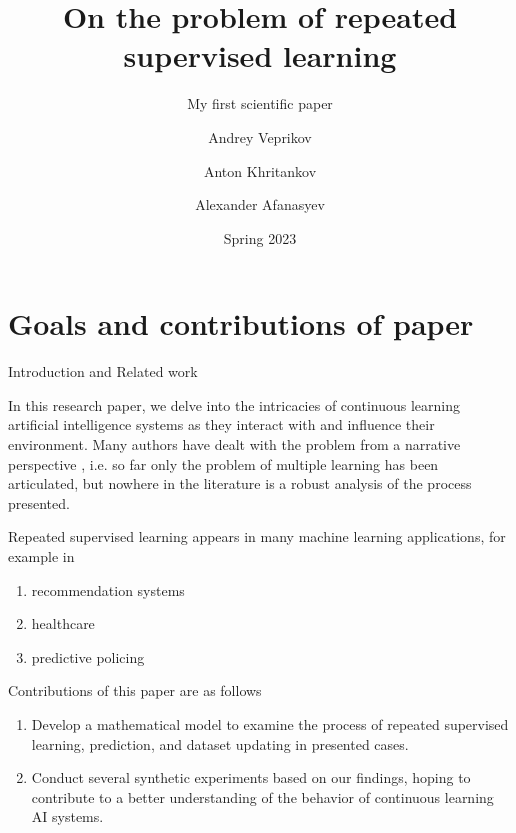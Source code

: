 \documentclass[aspectratio=169]{beamer}
\title[On the problem of repeated supervised learning]{On the problem of repeated supervised learning}
\subtitle{My first scientific paper}
\author[Andrey Veprikov]{Andrey Veprikov \and Anton Khritankov
\and Alexander Afanasyev}
\institute[veprikov.as@phystech.edu]{
MIPT\\
Dolgoprudny, Russia}
\date[Spring 2023]
{Spring 2023}
\begin{document}
\frame{\titlepage}
\section{Goals and contributions of paper}
    \begin{frame}{Introduction and Related work}
        \small

        In this research paper, we delve into the intricacies of continuous learning artificial intelligence systems as they interact with and influence their environment. Many authors have dealt with the problem from a narrative perspective \cite{bottou2013counterfactual, sculley2015hidden}, i.e. so far only the problem of multiple learning has been articulated, but nowhere in the literature is a robust analysis of the process presented.

        Repeated supervised learning appears in many machine learning applications, for example in 
        
        \begin{enumerate}
            \item recommendation systems \cite{khritankov2021existence}
    
            \item healthcare \cite{adam2020hidden}
    
            \item predictive policing \cite{ensign2018runaway}
        \end{enumerate}
        
        Contributions of this paper are as follows
        
        \begin{enumerate}
            \item Develop a mathematical model to examine the process of repeated supervised learning, prediction, and dataset updating in presented cases.
        
            \item Conduct several synthetic experiments based on our findings, hoping to contribute to a better understanding of the behavior of continuous learning AI systems.
        \end{enumerate}
        
    \end{frame}
\end{document}
